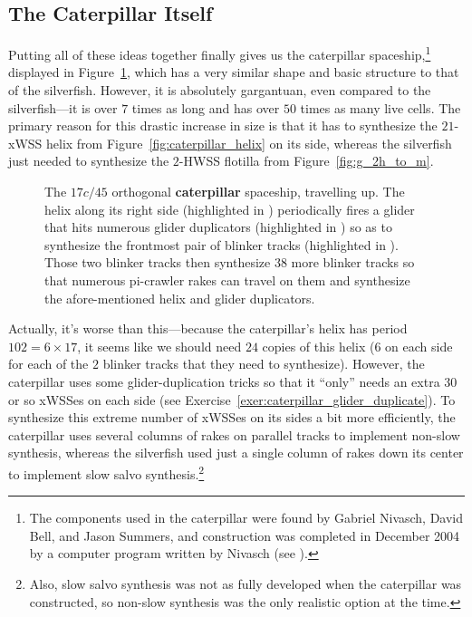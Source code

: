 \subsection{The Caterpillar Itself}\label{sec:caterpillar_itself}

Putting all of these ideas together finally gives us the caterpillar spaceship,\footnote{The components used in the caterpillar were found by Gabriel Nivasch, David Bell, and Jason Summers, and construction was completed in December 2004 by a computer program written by Nivasch (see ).} displayed in Figure~\ref{fig:caterpillar}, which has a very similar shape and basic structure to that of the silverfish. However, it is absolutely gargantuan, even compared to the silverfish---it is over $7$ times as long and has over $50$ times as many live cells. The primary reason for this drastic increase in size is that it has to synthesize the $21$-xWSS helix from Figure~\ref{fig:caterpillar_helix} on its side, whereas the silverfish just needed to synthesize the $2$-HWSS flotilla from Figure~\ref{fig:g_2h_to_m}.

\begin{figure}[!htbp]
	\centering
	\caption{The $17c/45$ orthogonal \textbf{caterpillar} spaceship, travelling up. The helix along its right side (highlighted in ) periodically fires a glider that hits numerous glider duplicators (highlighted in ) so as to synthesize the frontmost pair of blinker tracks (highlighted in ). Those two blinker tracks then synthesize $38$ more blinker tracks so that numerous pi-crawler rakes can travel on them and synthesize the afore-mentioned helix and glider duplicators.}\label{fig:caterpillar}
\end{figure}

Actually, it's worse than this---because the caterpillar's helix has period $102 = 6 \times 17$, it seems like we should need $24$ copies of this helix ($6$ on each side for each of the $2$ blinker tracks that they need to synthesize). However, the caterpillar uses some glider-duplication tricks so that it ``only'' needs an extra 30 or so xWSSes on each side (see Exercise~\ref{exer:caterpillar_glider_duplicate}). To synthesize this extreme number of xWSSes on its sides a bit more efficiently, the caterpillar uses several columns of rakes on parallel tracks to implement non-slow synthesis, whereas the silverfish used just a single column of rakes down its center to implement slow salvo synthesis.\footnote{Also, slow salvo synthesis was not as fully developed when the caterpillar was constructed, so non-slow synthesis was the only realistic option at the time.}


